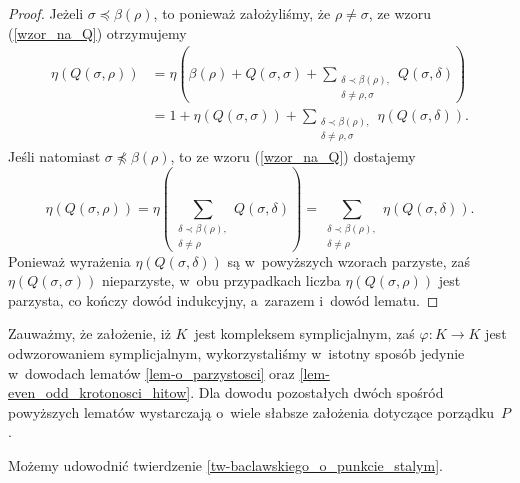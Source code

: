 \begin{proof}
Jeżeli $\sigma\preceq \beta(\rho)$, to ponieważ założyliśmy, że $\rho\not=\sigma$, ze wzoru (\ref{wzor_na_Q}) otrzymujemy \begin{align*}\eta(Q(\sigma,\rho))&=\eta\left(\beta(\rho)+Q(\sigma,\sigma)+\!\!\!\sum_{\substack{\delta\prec\beta(\rho),\\\delta\not=\rho,\sigma}}\! Q(\sigma,\delta)\right)\\&=1+\eta(Q(\sigma,\sigma))+\!\!\!\sum_{\substack{\delta\prec\beta(\rho),\\\delta\not=\rho,\sigma}}\!\eta(Q(\sigma,\delta)).\end{align*} Jeśli natomiast $\sigma\not\preceq\beta(\rho)$, to ze wzoru (\ref{wzor_na_Q}) dostajemy \[\eta(Q(\sigma,\rho))=\eta\left(\sum_{\substack{\delta\prec\beta(\rho),\\\delta\not=\rho}}Q(\sigma,\delta)\right)=\sum_{\substack{\delta\prec\beta(\rho),\\\delta\not=\rho}}\eta(Q(\sigma,\delta)).\] Ponieważ wyrażenia $\eta(Q(\sigma,\delta))$ są w~powyższych wzorach parzyste, zaś $\eta(Q(\sigma,\sigma))$ nieparzyste, w~obu przypadkach liczba $\eta(Q(\sigma,\rho))$ jest parzysta, co kończy dowód indukcyjny, a~zarazem i~dowód lematu.
\end{proof}

Zauważmy, że założenie, iż $K$~jest kompleksem symplicjalnym, zaś $\varphi\colon K\to K$ jest odwzorowaniem symplicjalnym, wykorzystaliśmy w~istotny sposób jedynie w~dowodach lematów \ref{lem-o_parzystosci} oraz \ref{lem-even_odd_krotonosci_hitow}. Dla dowodu pozostałych dwóch spośród powyższych lematów wystarczają o~wiele słabsze założenia dotyczące porządku~$P$. 

Możemy udowodnić twierdzenie \ref{tw-baclawskiego_o_punkcie_stalym}.

